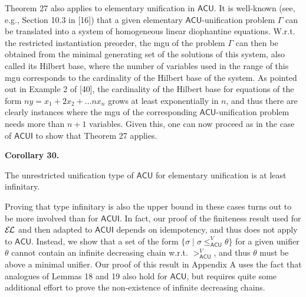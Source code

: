 \documentclass[10pt,a4paper]{amsart}
\begin{document}
Theorem 27 also applies to elementary unification in $\mathsf{ACU}$. It is well-known (see, e.g., Section 10.3 in [16]) that a given elementary $\mathsf{ACU}$-unification problem $\Gamma$ can be translated into a system of homogeneous linear diophantine equations. W.r.t. the restricted instantiation preorder, the mgu of the problem $\Gamma$ can then be obtained from the minimal generating set of the solutions of this system, also called its Hilbert base, where the number of variables used in the range of this mgu corresponds to the cardinality of the Hilbert base of the system. As pointed out in Example 2 of [40], the cardinality of the Hilbert base for equations of the form $ny=x_{1}+2x_{2}+\ldots nx_{n}$ grows at least exponentially in $n$, and thus there are clearly instances where the mgu of the corresponding $\mathsf{ACU}$-unification problem needs more than $n+1$ variables. Given this, one can now proceed as in the case of $\mathsf{ACUI}$ to show that Theorem 27 applies.\par
 
 
 
\par\medskip\noindent\textbf{Corollary 30.}\par
 
 
The unrestricted unification type of $\mathsf{ACU}$ for elementary unification is at least infinitary.\par
 
 
 
 
Proving that type infinitary is also the upper bound in these cases turns out to be more involved than for $\mathsf{ACUI}$. In fact, our proof of the finiteness result used for $\mathcal{E\mkern-1.618muL}$ and then adapted to $\mathsf{ACUI}$ depends on idempotency, and thus does not apply to $\mathsf{ACU}$. Instead, we show that a set of the form $\{\sigma\mid\sigma\leq_{\mathsf{ACU}}^{V}\theta\}$ for a given unifier $\theta$ cannot contain an infinite decreasing chain w.r.t. $>_{\mathsf{ACU}}^{V}$, and thus $\theta$ must be above a minimal unifier. Our proof of this result in Appendix A uses the fact that analogues of Lemmas 18 and 19 also hold for $\mathsf{ACU}$, but requires quite some additional effort to prove the non-existence of infinite decreasing chains.\par
 
\end{document}
